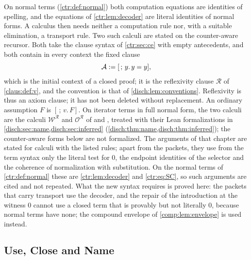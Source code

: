 On normal terms (\cref{ctr:def:normal}) both computation equations are identities of
spelling, and the equations of \cref{ctr:lem:decoder} are literal identities of normal
forms. A calculus then needs neither a computation rule nor, with a suitable elimination, a
transport rule. Two such calculi are stated on the counter-aware recursor. Both take the
clause syntax of \cref{ctr:sec:ce} with empty antecedents, and both contain in every context
the fixed clause
\begin{equation}\label{ctr:eq:reflclause}
 \mathcal A\mathrel{:=}[\,;\,y.\,y=y],
\end{equation}
which is the initial context of a closed proof; it is the reflexivity clause $\mathcal R$ of
\cref{claus:def:v}, and the convention is that of \cref{disch:lem:conventions}. Reflexivity
is thus an axiom clause; it has not been deleted without replacement. An ordinary assumption
$F$ is $[\,;\,v.\,F]$. On iterator terms in full normal form, the two calculi are the
calculi $\mathcal W^{\mathcal R}$ and $\mathcal O^{\mathcal R}$ of 
and , treated with their Lean formalizations in
\cref{disch:sec:name,disch:sec:inferred} (\cref{disch:thm:name,disch:thm:inferred}); the
counter-aware forms below are not formalized. The arguments of that chapter are stated for
calculi with the listed rules; apart from the packets, they use from the term syntax only
the literal test for $0$, the endpoint identities of the selector and the coherence of
normalization with substitution. On the normal terms of \cref{ctr:def:normal} these are
\cref{ctr:lem:decoder} and \eqref{ctr:eq:SC}, so such arguments are cited and not repeated. What the new syntax requires
is proved here: the packets that carry transport use the decoder, and the repair of the
introduction at the witness $0$ cannot use a closed term that is provably but not literally
$0$, because normal terms have none; the compound envelope of \cref{comp:lem:envelope} is
used instead.

\subsection{Use, Close and Name}

